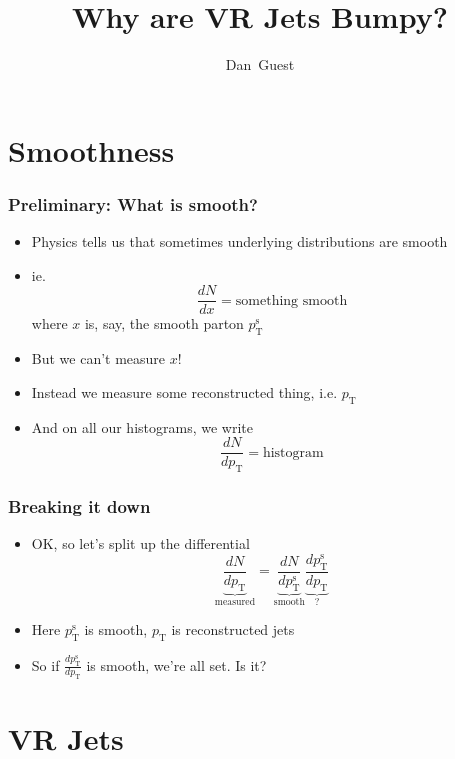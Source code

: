 \documentclass[xcolor={table}]{beamer}
\title{Why are VR Jets Bumpy?}
\author[dguest@cern.ch]{Dan~Guest}
\institute[UCI]{UC~Irvine}
\newcommand{\pt}{p_{\mathrm{T}}}
\newcommand{\ptr}{\pt}
\newcommand{\ptt}{\pt^{\text{s}}}
\begin{document}
\begin{frame}
  \maketitle
\end{frame}

\section{Smoothness}

\begin{frame}
  \frametitle{Preliminary: What is smooth?}
  \begin{itemize}
  \item Physics tells us that sometimes underlying distributions are smooth
  \item ie.
    \[ \frac{dN}{dx} = \text{something smooth} \]
    where $x$ is, say, the smooth parton $\ptt$
  \item But we can't measure $x$!
  \item Instead we measure some reconstructed thing, i.e. $\ptr$
  \item And on all our histograms, we write
    \[ \frac{dN}{d\ptr} = \text{histogram} \]
  \end{itemize}
\end{frame}

\begin{frame}
  \frametitle{Breaking it down}
  \begin{itemize}
  \item OK, so let's split up the differential
    \[ \underbrace{\frac{dN}{d\ptr}}_{\text{measured}} = \underbrace{\frac{dN}{d\ptt}}_{\text{smooth}} \underbrace{\frac{d\ptt}{d\ptr}}_{?} \]
  \item Here $\ptt$ is smooth, $\ptr$ is reconstructed jets
  \item So if $\frac{d\ptt}{d\ptr}$ is smooth, we're all set. Is it?
  \end{itemize}
\end{frame}

\section{VR Jets}
\end{document}
